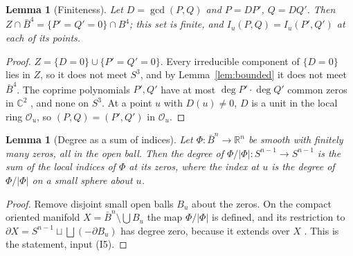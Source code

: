 \documentclass[11pt]{amsart}
\numberwithin{equation}{section}
\theoremstyle{plain}
\newtheorem{lemma}[theorem]{Lemma}
\theoremstyle{definition}
\theoremstyle{remark}
\newcommand{\R}{\mathbb{R}}
\newcommand{\C}{\mathbb{C}}
\begin{document}
\begin{lemma}[Finiteness]\label{lem:finite}
Let $D=\gcd(P,Q)$ and $P=DP'$, $Q=DQ'$. Then $Z\cap\bar B^4=\{P'=Q'=0\}\cap B^4$; this set is finite, and $I_u(P,Q)=I_u(P',Q')$ at each of its points.
\end{lemma}

\begin{proof}
$Z=\{D=0\}\cup\{P'=Q'=0\}$. Every irreducible component of $\{D=0\}$ lies in $Z$, so it does not meet $S^3$, and by Lemma~\ref{lem:bounded} it does not meet $\bar B^4$. The coprime polynomials $P',Q'$ have at most $\deg P'\cdot\deg Q'$ common zeros in $\C^2$ \cite[Section~5.3]{Ful69}, and none on $S^3$. At a point $u$ with $D(u)\neq0$, $D$ is a unit in the local ring $\mathcal O_u$, so $(P,Q)=(P',Q')$ in $\mathcal O_u$.
\end{proof}

\begin{lemma}[Degree as a sum of indices]\label{lem:indexsum}
Let $\Phi\colon\bar B^{n}\to\R^{n}$ be smooth with finitely many zeros, all in the open ball. Then the degree of $\Phi/|\Phi|\colon S^{n-1}\to S^{n-1}$ is the sum of the local indices of $\Phi$ at its zeros, where the index at $u$ is the degree of $\Phi/|\Phi|$ on a small sphere about $u$.
\end{lemma}

\begin{proof}
Remove disjoint small open balls $B_u$ about the zeros. On the compact oriented manifold $X=\bar B^n\setminus\bigcup B_u$ the map $\Phi/|\Phi|$ is defined, and its restriction to $\partial X=S^{n-1}\sqcup\bigsqcup(-\partial B_u)$ has degree zero, because it extends over $X$ \cite[Section~5, Lemma~1]{Mil65}. This is the statement, input (I5).
\end{proof}
\end{document}
